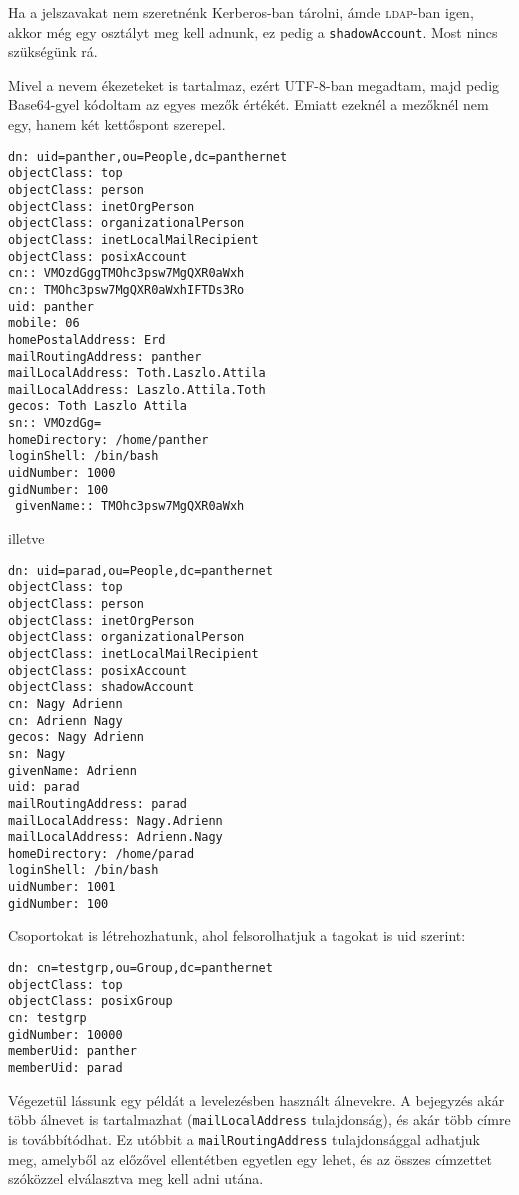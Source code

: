 Ha a jelszavakat nem szeretnénk Kerberos-ban tárolni, ámde \textsc{ldap}-ban igen, akkor még egy osztályt meg kell adnunk, ez
pedig a \texttt{shadowAccount}. Most nincs szükségünk rá.

Mivel a nevem ékezeteket is tartalmaz, ezért UTF-8-ban megadtam, majd pedig Base64-gyel kódoltam az egyes mezők
értékét. Emiatt ezeknél a mezőknél nem egy, hanem két kettőspont szerepel.

\begin{Verbatim}[frame=single]
dn: uid=panther,ou=People,dc=panthernet
objectClass: top
objectClass: person
objectClass: inetOrgPerson
objectClass: organizationalPerson
objectClass: inetLocalMailRecipient
objectClass: posixAccount
cn:: VMOzdGggTMOhc3psw7MgQXR0aWxh
cn:: TMOhc3psw7MgQXR0aWxhIFTDs3Ro
uid: panther
mobile: 06
homePostalAddress: Erd
mailRoutingAddress: panther
mailLocalAddress: Toth.Laszlo.Attila
mailLocalAddress: Laszlo.Attila.Toth
gecos: Toth Laszlo Attila
sn:: VMOzdGg=
homeDirectory: /home/panther
loginShell: /bin/bash
uidNumber: 1000
gidNumber: 100
 givenName:: TMOhc3psw7MgQXR0aWxh
\end{Verbatim}

\noindent illetve

\begin{Verbatim}[frame=single]
dn: uid=parad,ou=People,dc=panthernet
objectClass: top
objectClass: person
objectClass: inetOrgPerson
objectClass: organizationalPerson
objectClass: inetLocalMailRecipient
objectClass: posixAccount
objectClass: shadowAccount
cn: Nagy Adrienn
cn: Adrienn Nagy
gecos: Nagy Adrienn
sn: Nagy
givenName: Adrienn
uid: parad
mailRoutingAddress: parad
mailLocalAddress: Nagy.Adrienn
mailLocalAddress: Adrienn.Nagy
homeDirectory: /home/parad
loginShell: /bin/bash
uidNumber: 1001
gidNumber: 100
\end{Verbatim}

\noindent Csoportokat is létrehozhatunk, ahol felsorolhatjuk a tagokat is uid szerint:

\begin{Verbatim}[frame=single]
dn: cn=testgrp,ou=Group,dc=panthernet
objectClass: top
objectClass: posixGroup
cn: testgrp
gidNumber: 10000
memberUid: panther
memberUid: parad
\end{Verbatim}


Végezetül lássunk egy példát a levelezésben használt álnevekre. A bejegyzés akár több álnevet is tartalmazhat
(\texttt{mailLocalAddress} tulajdonság), és akár több címre is továbbítódhat. Ez utóbbit a \texttt{mailRoutingAddress}
tulajdonsággal adhatjuk meg, amelyből az előzővel ellentétben egyetlen egy lehet, és az összes címzettet szóközzel
elválasztva meg kell adni utána.

